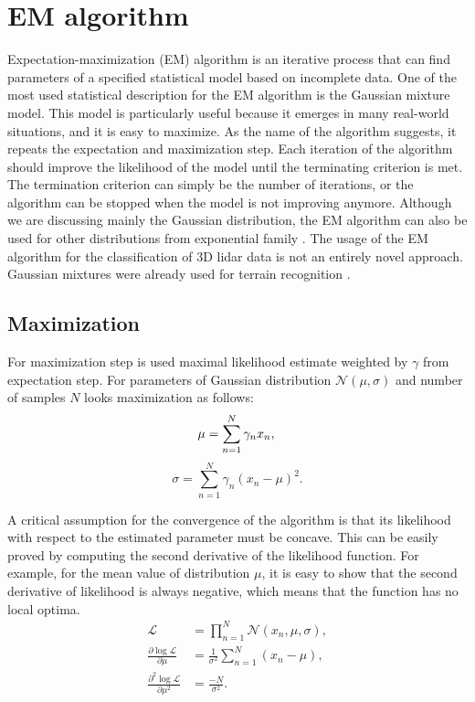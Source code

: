\section{EM algorithm}
Expectation-maximization (EM) algorithm is an iterative process that can find parameters of a specified statistical model based on incomplete data. One of the most used statistical description for the EM algorithm is the Gaussian mixture model. This model is particularly useful because it emerges in many real-world situations, and it is easy to maximize. As the name of the algorithm suggests, it repeats the expectation and maximization step. Each iteration of the algorithm should improve the likelihood of the model until the terminating criterion is met. The termination criterion can simply be the number of iterations, or the algorithm can be stopped when the model is not improving anymore. Although we are discussing mainly the Gaussian distribution, the EM algorithm can also be used for other distributions from exponential family \cite{dempster1977}. The usage of the EM algorithm for the classification of 3D lidar data is not an entirely novel approach. Gaussian mixtures were already used for terrain recognition \cite{lalonde2006}.
 
\subsection{Maximization}
For maximization step is used maximal likelihood estimate weighted by $\gamma$ from expectation step. For parameters of Gaussian distribution $\mathcal{N}(\mu, \sigma)$ and number of samples $N$ looks maximization as follows:
\begin{equation}
\mu = \sum_{n = 1}^{N} \gamma_n x_n, \\
\end{equation}
\begin{equation}
\sigma = \sum_{n = 1}^{N}\gamma_n (x_n - \mu)^2 .
\end{equation}

A critical assumption for the convergence of the algorithm is that its likelihood with respect to the estimated parameter must be concave. This can be easily proved by computing the second derivative of the likelihood function. For example, for the mean value of distribution  $\mu$, it is easy to show that the second derivative of likelihood is always negative, which means that the function has no local optima.
\begin{align}
\mathcal{L} &= \prod_{n=1}^N \mathcal{N}(x_n, \mu, \sigma), \\
\frac{\partial \log \mathcal{L}}{\partial \mu} &= \frac{1}{\sigma^2} \sum_{n = 1}^{N} (x_n - \mu), \\
\frac{\partial^2 \log \mathcal{L}}{\partial \mu^2} &= \frac{-N}{\sigma^2}.
\end{align}


